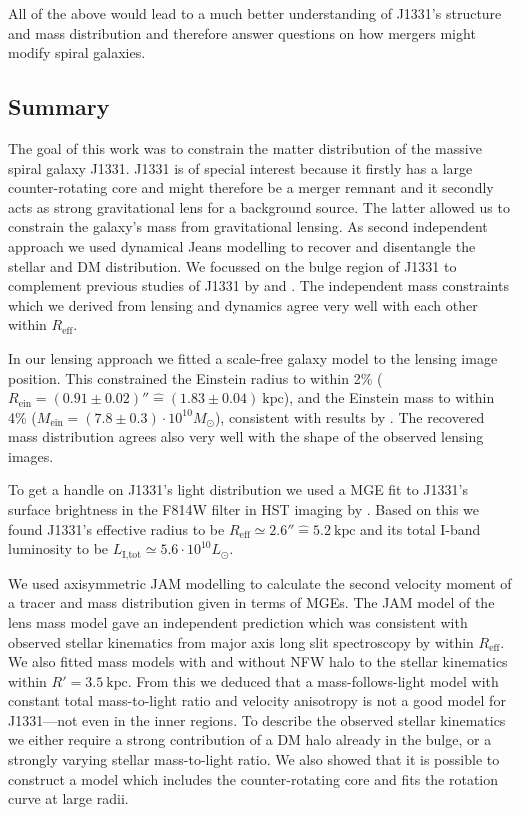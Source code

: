 \documentclass[useAMS,usenatbib]{mnras}
\begin{document}
All of the above would lead to a much better understanding of J1331's structure and mass distribution and therefore answer questions on how mergers might modify spiral galaxies.

\subsection{Summary}

The goal of this work was to constrain the matter distribution of the massive spiral galaxy J1331. J1331 is of special interest because it firstly has a large counter-rotating core and might therefore be a merger remnant and it secondly acts as strong gravitational lens for a background source. The latter allowed us to constrain the galaxy's mass from gravitational lensing. As second independent approach we used dynamical Jeans modelling to recover and disentangle the stellar and DM distribution. We focussed on the bulge region of J1331 to complement previous studies of J1331 by \citet{SWELLSIII} and \citet{SWELLSV}. The independent mass constraints which we derived from lensing and dynamics agree very well with each other within $R_\text{eff}$.

In our lensing approach we fitted a scale-free galaxy model to the lensing image position. This constrained the Einstein radius to within 2\% ($R_\text{ein}=(0.91\pm0.02)'' \hat{=}(1.83\pm0.04)~\text{kpc}$), and the Einstein mass to within 4\% ($M_\text{ein} = (7.8\pm0.3) \cdot 10^{10} M_\odot$), consistent with results by \citet{SWELLSIII}. The recovered mass distribution agrees also very well with the shape of the observed lensing images.

To get a handle on J1331's light distribution we used a MGE fit to J1331's surface brightness in the F814W filter in HST imaging by \citet{SWELLSI}. Based on this we found J1331's effective radius to be $R_\text{eff} \simeq 2.6'' \hat{=} 5.2~\text{kpc}$ and its total I-band luminosity to be $L_\text{I,tot} \simeq 5.6 \cdot 10^{10} L_\odot$.

We used axisymmetric JAM modelling to calculate the second velocity moment of a tracer and mass distribution given in terms of MGEs. The JAM model of the lens mass model gave an independent prediction which was consistent with observed stellar kinematics from major axis long slit spectroscopy by \citet{SWELLSV} within $R_\text{eff}$. We also fitted mass models with and without NFW halo to the stellar kinematics within $R'=3.5~\text{kpc}$. From this we deduced that a mass-follows-light model with constant total mass-to-light ratio and velocity anisotropy is not a good model for J1331---not even in the inner regions. To describe the observed stellar kinematics we either require a strong contribution of a DM halo already in the bulge, or a strongly varying stellar mass-to-light ratio. We also showed that it is possible to construct a model which includes the counter-rotating core and fits the rotation curve at large radii.
\end{document}
